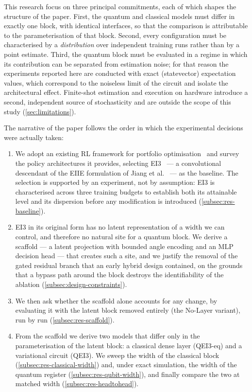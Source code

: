 \documentclass[aps,floatfix,superscriptaddress,twocolumn,tightenlines,amsmath,amssymb,nofootinbib,10pt,longbibliography,prl]{revtex4-2}
\begin{document}
%
This research focus on three principal commitments, each of which shapes the
structure of the paper. First, the quantum and classical models must differ in
exactly one block, with identical interfaces, so that the comparison is
attributable to the parameterisation of that block. Second, every configuration
must be characterised by a \emph{distribution} over independent training runs
rather than by a point estimate. Third, the quantum block must be evaluated in
a regime in which its contribution can be separated from estimation noise; for
that reason the experiments reported here are conducted with exact
(statevector) expectation values, which correspond to the noiseless limit of
the circuit and isolate the architectural effect. Finite-shot estimation and
execution on hardware introduce a second, independent source of stochasticity
and are outside the scope of this study (\ref{sec:limitations}).

The narrative of the paper follows the order in which the experimental
decisions were actually taken:

\begin{enumerate}
  \item We adopt an existing RL framework for portfolio
        optimisation~\cite{RLportfolio} and survey the policy architectures it
        provides, selecting EI3~\cite{costa2023} --- a convolutional descendant
        of the EIIE formulation of Jiang et al.~\cite{jiang2017} --- as the
        baseline. The selection is supported by an experiment, not by
        assumption: EI3 is characterised across three training budgets to
        establish both its attainable level and its dispersion before any
        modification is introduced (\ref{subsec:res-baseline}).
  \item EI3 in its original form has no latent representation of a width we can
        control, and therefore no natural site for a quantum block. We derive a
        scaffold --- a latent projection with bounded angle encoding and an MLP decision head --- that creates such a site, and we justify the removal of the gated residual branch that an early hybrid design contained, on the grounds that a bypass path around the block destroys the identifiability of the ablation (\ref{subsec:design-constraints}).
  \item We then ask whether the scaffold alone accounts for any change, by
        evaluating it with the latent block removed entirely (the No-Layer
        variant), run by run (\ref{subsec:res-scaffold}).
  \item From the scaffold we derive two models that differ only in the
        parameterisation of the latent block: a classical dense layer
        (QEI3-eq) and a variational circuit (QEI3). We sweep the width of the
        classical block (\ref{subsec:res-classical-width}) and, under exact
        simulation, the width of the quantum register
        (\ref{subsec:res-qubit-width}), and finally compare the two at matched
        width (\ref{subsec:res-headtohead}).
\end{enumerate}
\end{document}

